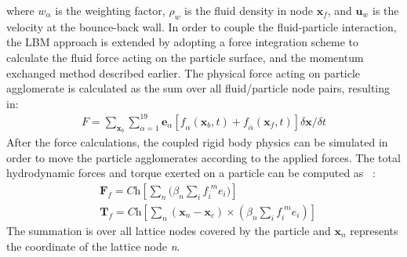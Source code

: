 where $\textit{w}_{\alpha}$ is the weighting factor, $\rho_{\textit{w}}$ is the fluid density in node $\mathbf{x}_{\textit{f}}$, and $ \mathbf{u}_{\textit{w}}  $ is the velocity at the bounce-back wall. In order to couple the fluid-particle interaction, the LBM approach is extended by adopting a force integration scheme to calculate the fluid force acting on the particle surface, and the momentum exchanged method described earlier. The physical force acting on particle agglomerate is calculated as the sum over all fluid/particle node pairs, resulting in: 
\begin{align}
\textit{F} = \sum\limits_{\mathbf{x}_{b}}\sum\limits_{\alpha=1}^{19}{\mathbf{e}_{\alpha}[\textit{f}_{\alpha}(\mathbf{x}_{b},t)+\textit{f}_{\overline{\alpha}}(\mathbf{x}_{f},t)] \delta \mathbf{x} / \delta t}
\end{align}
After the force calculations, the coupled rigid body physics can be simulated in order to move the particle agglomerates according to the applied forces. The total hydrodynamic forces and torque exerted on a particle can be computed as ~\citep{cook2004, noble1998}:
\begin{align}
& \mathbf{F}_{f} = \textit{Ch}[\sum\limits_{\textit{n}}{(\beta_{\textit{n}} \sum\limits_{\textit{i}}{\textit{f}_{\textit{i}}^{\textit{ m}}\mathbf{\textit{e}}_{\textit{i}}}})] \\ 
& \mathbf{T}_{f} = \textit{Ch}[\sum\limits_{\textit{n}}{(\mathbf{x}_{\textit{n}}-\mathbf{x}_{\textit{c}}) \times (\beta_{\textit{n}} \sum\limits_{\textit{i}}{\textit{f}_{\textit{i}}^{\textit{ m}}\mathbf{\textit{e}}_{\textit{i}}})}]
\end{align}
The summation is over all lattice nodes covered by the particle and $\mathbf{x}_{\textit{n}}$ represents the coordinate of the lattice node \textit{n}.
